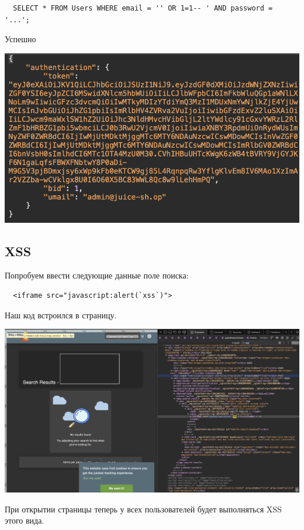 \documentclass{article}
\begin{document}
\begin{lstlisting}
  SELECT * FROM Users WHERE email = '' OR 1=1-- ' AND password = '...';
\end{lstlisting}
Успешно
\begin{center}
  \includegraphics[width=.9\textwidth]{i1111}
\end{center}

\subsection{XSS}

Попробуем ввести следующие данные поле поиска:

\begin{lstlisting}
  <iframe src="javascript:alert(`xss`)">
\end{lstlisting}

Наш код встроился в страницу.
\begin{center}
  \includegraphics[width=.9\textwidth]{x1}
\end{center}

При открытии страницы теперь у всех пользователей будет выполняться XSS этого вида.
\end{document}
